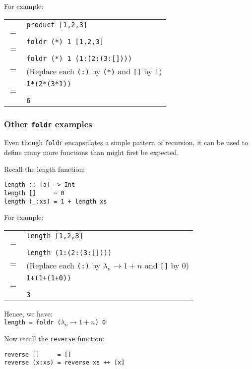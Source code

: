 \begin{multicols}{2}
For example:\\
\begin{tabularx}{\linewidth}{lX}
  & \lstinline{product [1,2,3]}\\
  \(=\) & \\
  & \lstinline{foldr (*) 1 [1,2,3]}\\
  \(=\) & \\
  & \lstinline{foldr (*) 1 (1:(2:(3:[])))}\\
  \(=\) & \tiny{(Replace each \lstinline{(:)} by \lstinline{(*)} and \lstinline{[]} by 1)} \\
  & \lstinline{1*(2*(3*1))}\\
  \(=\) & \\
  & \lstinline{6}\\
\end{tabularx}

\subsubsection{Other \lstinline{foldr} examples}
Even though \lstinline{foldr} encapsulates a simple pattern of recursion, it can be used to define many more functions than might first be expected.

Recall the length function:
\begin{lstlisting}
length :: [a] -> Int
length []     = 0
length (_:xs) = 1 + length xs
\end{lstlisting}

For example:\\
\begin{tabularx}{\linewidth}{lX}
  & \lstinline{length [1,2,3]}\\
  \(=\) & \\
  & \lstinline{length (1:(2:(3:[])))}\\
  \(=\) & \tiny{(Replace each \lstinline{(:)} by \(\lambda_n \rightarrow 1 + n\) and \lstinline{[]} by 0)} \\
  & \lstinline{1+(1+(1+0))}\\
  \(=\) & \\
  & \lstinline{3}\\
\end{tabularx}

Hence, we have:\\
\lstinline{length = foldr (}\(\lambda_n \rightarrow 1+n\)\lstinline{) 0}

Now recall the \lstinline{reverse} function:
\begin{lstlisting}
reverse []     = []
reverse (x:xs) = reverse xs ++ [x]
\end{lstlisting}


\end{multicols}
